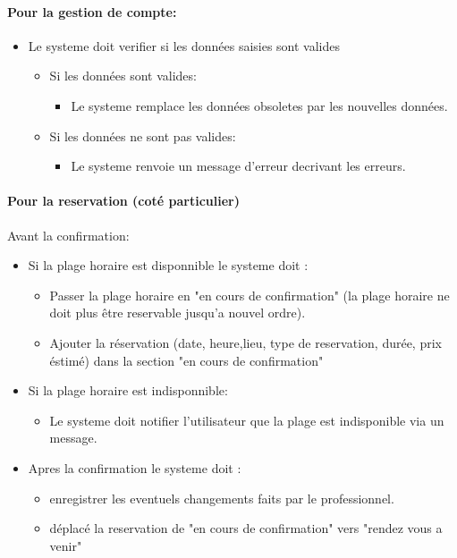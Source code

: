 \documentclass{article}
\begin{document}
\paragraph{Pour la gestion de compte: }
\begin{itemize}
\item Le systeme doit verifier si les données saisies sont valides
	\begin{itemize}
	\item Si les données sont valides:
		\begin{itemize}
		\item Le systeme remplace les données obsoletes par les nouvelles données.
		\end{itemize}
		\item Si les données ne sont pas valides:
		\begin{itemize}
		\item Le systeme renvoie un message d'erreur decrivant les erreurs.
		\end{itemize}
	\end{itemize}

\end{itemize}


\paragraph{Pour la reservation (coté particulier)}
Avant la confirmation:
	\begin{itemize}
	\item Si la plage horaire est disponnible le systeme doit :
		\begin{itemize}
		\item Passer la plage horaire en "en cours de confirmation" 
			(la plage horaire ne doit plus être reservable jusqu'a nouvel ordre).
		\item Ajouter la réservation (date, heure,lieu, type de reservation, durée, prix éstimé) dans la section "en cours de confirmation"
		\end{itemize}
	\item Si la plage horaire est indisponnible:
		\begin{itemize}
		\item Le systeme doit notifier l'utilisateur que la plage est indisponible via un message.
		\end{itemize}
	\item Apres la confirmation le systeme doit :
		\begin{itemize}
		\item enregistrer les eventuels changements faits par le professionnel.
		\item déplacé la reservation de "en cours de confirmation" vers "rendez vous a venir"


		\end{itemize}
	\end{itemize}
\end{document}

